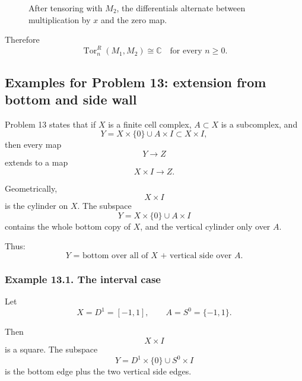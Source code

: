 \documentclass[12pt,a4paper]{article}
\theoremstyle{notespace}
\begin{document}
\begin{figure}[htbp]
	\centering
	\caption{After tensoring with \(M_2\), the differentials alternate between multiplication by \(x\) and the zero map.}
\end{figure}

Therefore
\[
\boxed{
	\operatorname{Tor}_n^R(M_1,M_2)\cong \mathbb C
	\quad
	\text{for every }n\geq 0.
}
\]

\subsection*{Examples for Problem 13: extension from bottom and side wall}

Problem 13 states that if \(X\) is a finite cell complex, \(A\subset X\) is a subcomplex, and
\[
Y=X\times\{0\}\cup A\times I
\subset X\times I,
\]
then every map
\[
Y\to Z
\]
extends to a map
\[
X\times I\to Z.
\]

Geometrically,
\[
X\times I
\]
is the cylinder on \(X\). The subspace
\[
Y=X\times\{0\}\cup A\times I
\]
contains the whole bottom copy of \(X\), and the vertical cylinder only over \(A\).

Thus:
\[
\text{\(Y\) = bottom over all of \(X\) + vertical side over \(A\).}
\]

\subsubsection*{Example 13.1. The interval case}

Let
\[
X=D^1=[-1,1],
\qquad
A=S^0=\{-1,1\}.
\]

Then
\[
X\times I
\]
is a square. The subspace
\[
Y=D^1\times\{0\}\cup S^0\times I
\]
is the bottom edge plus the two vertical side edges.
\end{document}
